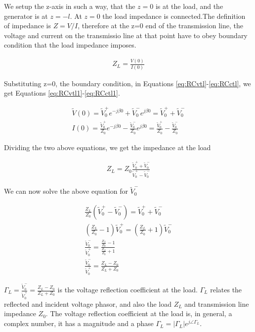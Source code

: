 \documentclass{ximera}
\begin{document}
We setup the z-axis in such a way, that the $z=0$ is at the load, and the generator is at $z=-l$. At $z=0$ the load impedance is connected.The definition of  impedance  is $Z=V/I$, therefore at the z=0 end of the transmission line, the voltage and current on the transmissio line at that point have to obey boundary condition that the load impedance imposes.

\begin{eqnarray}
Z_L=\frac{V(0)}{I(0)} \nonumber 
\end{eqnarray}

Substituting z=0, the boundary condition, in Equations \ref{eq:RCvtl}-\ref{eq:RCctl}, we get Equations \ref{eq:RCvtl1}-\ref{eq:RCctl1}.

\begin{eqnarray}
\tilde{V}(0)=\tilde{V}_0^+ e^{-j \beta 0} +\tilde{V}_0^- e^{j \beta 0} = \tilde{V}_0^+ + \tilde{V}_0^- \label{eq:RCvtl1} \\ 
I(0)=\frac{\tilde{V}_0^+}{Z_0} e^{- j \beta 0} - \frac{\tilde{V}_0^-}{Z_0} e^{ j \beta 0} =\frac{\tilde{V}_0^+}{Z_0} - \frac{\tilde{V}_0^-}{Z_0}\label{eq:RCctl1}
\end{eqnarray}

Dividing the two above equations, we get the impedance at the load


\begin{eqnarray}
Z_L=Z_0 \frac{\tilde{V}_0^+ + \tilde{V}_0^-}{\tilde{V}_0^+ - \tilde{V}_0^-}
\end{eqnarray}


We can now solve the above equation for $\tilde{V}_0^-$

\begin{eqnarray}
\frac{Z_L}{Z_0} (\tilde{V}_0^+ - \tilde{V}_0^-) = \tilde{V}_0^+ + \tilde{V}_0^- \nonumber \\
(\frac{Z_L}{Z_0}-1)\tilde{V}_0^+ =(\frac{Z_L}{Z_0}+1) \tilde{V}_0^- \nonumber \\
\frac{\tilde{V}_0^-}{\tilde{V}_0^+} = \frac{\frac{Z_L}{Z_0}-1  }{ \frac{Z_L}{Z_0}+1 }
\nonumber \\
\frac{\tilde{V}_0^-}{\tilde{V}_0^+} = \frac{Z_L -Z_0}{Z_L +Z_0}
\end{eqnarray}


\begin{definition}
$\Gamma_L=\frac{\tilde{V}_0^-}{\tilde{V}_0^+}= \frac{Z_L -Z_0}{Z_L +Z_0}$ is the voltage reflection
coefficient at the load. $\Gamma_L$ relates the reflected and incident voltage
phasor, and also the load $Z_L$ and transmission line impedance $Z_0$. The voltage reflection coefficient at the load is, in general, a complex number,
it has a magnitude and a phase $\Gamma_L=|\Gamma_L| e^{j \angle \Gamma_L}$.

\end{definition}
\end{document}
